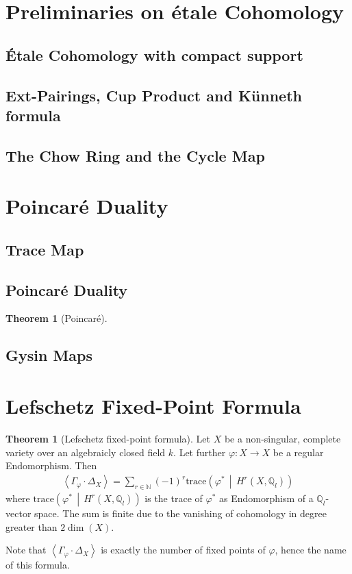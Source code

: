 \documentclass[english]{scrartcl}
\theoremstyle{definition}
\newtheorem{Thm}[Def]{Theorem}
\theoremstyle{remark}
\newcommand*{\N}{\mathds{N}}
\newcommand*{\Z}{\mathds{Z}}
\newcommand*{\Q}{\mathds{Q}}
\newcommand*{\Zl}{\Z_l} %
\newcommand*{\Ql}{\Q_l} %
\newcommand*{\intProd}[2]{#1\cdot#2} %
\newcommand*{\intNum}[1]{\left\langle{#1}\right\rangle} %
\newcommand*{\Graph}[1]{\Gamma_{#1}} %
\newcommand*{\Diag}[1]{\Delta_{#1}} %
\newcommand*{\trace}[2]{\text{trace}\left(#1 \,\middle|\, #2 \right)} %
\renewcommand*{\phi}{\varphi}
\begin{document}
\section{Preliminaries on étale Cohomology}

\subsection{Étale Cohomology with compact support}
\subsection{Ext-Pairings, Cup Product and Künneth formula}
\subsection{The Chow Ring and the Cycle Map}

\section{Poincaré Duality}
\subsection{Trace Map}
\subsection{Poincaré Duality}
\begin{Thm}[Poincaré]
  
\end{Thm}
\subsection{Gysin Maps}

\section{Lefschetz Fixed-Point Formula}

\begin{Thm}[Lefschetz fixed-point formula]\label{lefschetzthm}
  Let $X$ be a non-singular, complete variety over an algebraicly
  closed field $k$.
  Let further $\phi\colon X\to X$ be a regular Endomorphism.
  Then
  \begin{gather*}
    \intNum{\intProd{\Graph{\phi}}{\Diag{X}}}
    = \sum_{r\in\N} (-1)^r \trace{\phi^*}{H^r(X,\Ql)}
  \end{gather*}
  where $\trace{\phi^*}{H^r(X,\Ql)}$ is the trace of $\phi^*$ as
  Endomorphism of a $\Ql$-vector space. 
  The sum is finite due to the vanishing
  of cohomology in degree greater than $2\dim(X)$. 
\end{Thm}
Note that $\intNum{\intProd{\Graph{\phi}}{\Diag{X}}}$ is exactly the number of
fixed points of $\phi$, hence the name of this formula.
\end{document}
